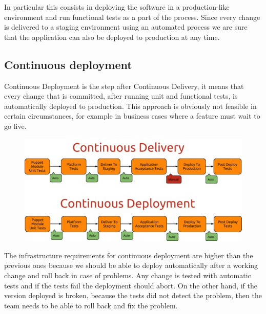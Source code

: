 In particular this consists in deploying the software in a production-like
environment and run functional tests as a part of the process. Since every
change is delivered to a staging environment using an automated process we are
sure that the application can also be deployed to production at any time.

\subsection{Continuous deployment}

Continuous Deployment is the step after Continuous Delivery, it means that
every change that is committed, after running unit and functional tests, is
automatically deployed to production. This approach is obviously not feasible
in certain circumstances, for example in business cases where a feature must
wait to go live.

\begin{figure}[H]
\includegraphics[width=\textwidth,height=\textheight,keepaspectratio]{Introduction/Continuous_Delivery_Continuous_Deployment.jpg}
\end{figure}

The infrastructure requirements for continuous deployment are higher than
the previous ones because we should be able to deploy automatically after
a working change and roll back in case of problems. Any change is tested
with automatic tests and if the tests fail the deployment should abort. On
the other hand, if the version deployed is broken, because the tests did
not detect the problem, then the team needs to be able to roll back and
fix the problem.
